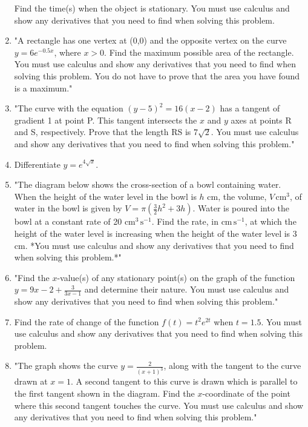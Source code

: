 \documentclass{article}
\begin{document}
\begin{enumerate}
Find the time(s) when the object is stationary. You must use calculus and show any derivatives that you need to find when solving this problem.
\vspace{3cm}
\item "A rectangle has one vertex at (0,0) and the opposite vertex on the curve \( y = 6e^{-0.5x} \), where \( x > 0 \). Find the maximum possible area of the rectangle. You must use calculus and show any derivatives that you need to find when solving this problem. You do not have to prove that the area you have found is a maximum."
\vspace{3cm}
\item "The curve with the equation \((y - 5)^2 = 16(x - 2)\) has a tangent of gradient 1 at point P. This tangent intersects the \(x\) and \(y\) axes at points R and S, respectively. Prove that the length RS is \(7\sqrt{2}\). You must use calculus and show any derivatives that you need to find when solving this problem."
\vspace{3cm}
\item Differentiate \( y = e^{4\sqrt{x}} \).
\vspace{3cm}
\item "The diagram below shows the cross-section of a bowl containing water. When the height of the water level in the bowl is \( h \) cm, the volume, \( V \, \text{cm}^3 \), of water in the bowl is given by \( V = \pi \left( \frac{3}{2} h^2 + 3h \right) \). Water is poured into the bowl at a constant rate of 20 \(\text{cm}^3 \, \text{s}^{-1}\). Find the rate, in \(\text{cm} \, \text{s}^{-1}\), at which the height of the water level is increasing when the height of the water level is 3 cm. *You must use calculus and show any derivatives that you need to find when solving this problem.*"
\vspace{3cm}
\item "Find the \( x \)-value(s) of any stationary point(s) on the graph of the function \( y = 9x - 2 + \frac{3}{3x - 1} \) and determine their nature. You must use calculus and show any derivatives that you need to find when solving this problem."
\vspace{3cm}
\item Find the rate of change of the function \( f(t) = t^2 e^{2t} \) when \( t = 1.5 \). You must use calculus and show any derivatives that you need to find when solving this problem.
\vspace{3cm}
\item "The graph shows the curve \( y = \frac{2}{(x+1)^3} \), along with the tangent to the curve drawn at \( x = 1 \). A second tangent to this curve is drawn which is parallel to the first tangent shown in the diagram. Find the \( x \)-coordinate of the point where this second tangent touches the curve. You must use calculus and show any derivatives that you need to find when solving this problem."

\end{enumerate}
\end{document}
